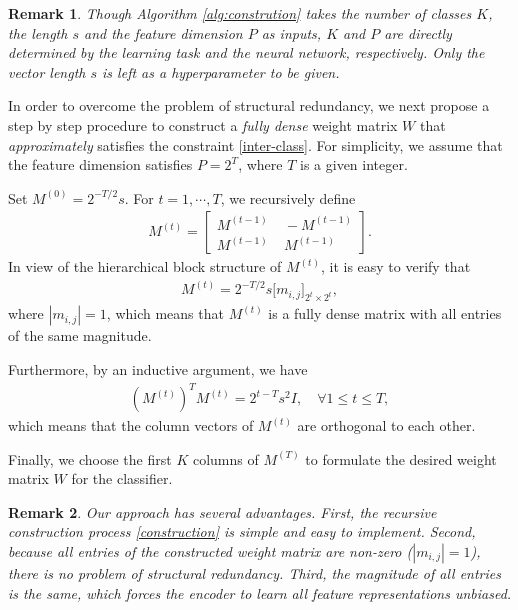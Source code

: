 \documentclass[preprint,review,12pt]{elsarticle}
\newtheorem{rmrk}{Remark}
\numberwithin{equation}{section}
\begin{document}
\begin{rmrk}
	Though Algorithm \ref{alg:constrution} takes the number of classes $K$, the length $s$ and the feature dimension $P$ as inputs,
	$K$ and $P$ are directly determined by the learning task and the neural network, respectively.
	Only the vector length $s$  is left as a hyperparameter to be given.
\end{rmrk}

	
In order to overcome the problem of structural redundancy,
we next propose a step by step procedure to construct a \textit{fully dense} weight matrix $ W $
that \textit{approximately} satisfies the constraint \eqref{inter-class}.
For simplicity,  we assume that the feature dimension satisfies $ P = 2^T $, where $ T $ is a given integer.

Set $ M^{(0)}=2^{-T/2} s $.	For $ t = 1, \cdots, T $, we recursively define
	\begin{align}
		\label{construction}
		M^{(t)} =
		\left [
		\begin{array}{cc}
			M^{(t-1)} &\; -M^{(t-1)} \\
			M^{(t-1)} &\;  M^{(t-1)}
		\end{array}
		\right ].
	\end{align}
 In view of the hierarchical block structure of  $ M^{(t)} $,
it is easy to verify that
 \begin{align}	
		M^{(t)} = 2^{-T/2} s  \bigg[m_{i,j}\bigg]_{2^t \times 2^t},
	\end{align}
where $ |m_{i,j}|=1 $,
which means that $ M^{(t)} $ is a fully dense matrix with all entries of the same magnitude.

Furthermore, by an inductive argument, we have
	\begin{align*}
		( M^{(t)})^T M^{(t)}  = 2^{t-T}  s^2 I,  \quad \forall 1 \leq t \leq T,
	\end{align*}
which means that the column vectors of $ M^{(t)}$ are orthogonal to each other.
	
Finally,  we choose the first $ K $ columns of $ M^{(T)} $ to formulate the  desired weight matrix $ W $ for the classifier.


\begin{rmrk}
    Our approach has several advantages.
    First, the recursive construction process \eqref{construction} is simple and easy to implement.
    Second, because all entries of the constructed weight matrix are non-zero ($ |m_{i,j}|=1 $),
    there is no problem of structural redundancy.
    Third, the magnitude of all entries is the same, which forces the encoder to learn all feature representations unbiased.
\end{rmrk}
\end{document}
